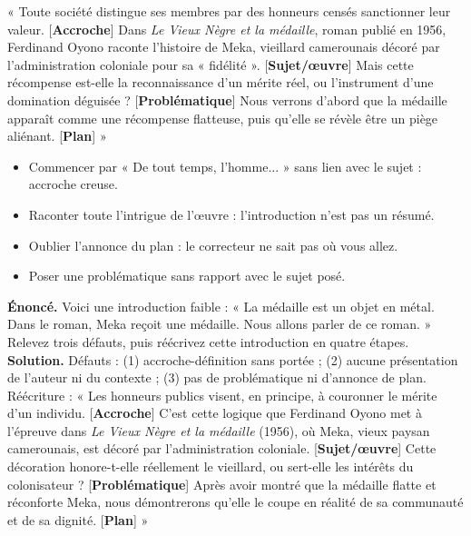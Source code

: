 \documentclass[11pt]{article}
\begin{document}
\begin{exemplebox}
« Toute société distingue ses membres par des honneurs censés sanctionner leur valeur. [\textbf{Accroche}] Dans \emph{Le Vieux Nègre et la médaille}, roman publié en 1956, Ferdinand Oyono raconte l'histoire de Meka, vieillard camerounais décoré par l'administration coloniale pour sa « fidélité ». [\textbf{Sujet/œuvre}] Mais cette récompense est-elle la reconnaissance d'un mérite réel, ou l'instrument d'une domination déguisée ? [\textbf{Problématique}] Nous verrons d'abord que la médaille apparaît comme une récompense flatteuse, puis qu'elle se révèle être un piège aliénant. [\textbf{Plan}] »
\end{exemplebox}

\begin{attention}
\begin{itemize}
\item Commencer par « De tout temps, l'homme... » sans lien avec le sujet : accroche creuse.
\item Raconter toute l'intrigue de l'œuvre : l'introduction n'est pas un résumé.
\item Oublier l'annonce du plan : le correcteur ne sait pas où vous allez.
\item Poser une problématique sans rapport avec le sujet posé.
\end{itemize}
\end{attention}

\begin{exoresolu}
\textbf{Énoncé.} Voici une introduction faible : « La médaille est un objet en métal. Dans le roman, Meka reçoit une médaille. Nous allons parler de ce roman. » Relevez trois défauts, puis réécrivez cette introduction en quatre étapes.
\tcblower
\textbf{Solution.} Défauts : (1) accroche-définition sans portée ; (2) aucune présentation de l'auteur ni du contexte ; (3) pas de problématique ni d'annonce de plan. Réécriture : « Les honneurs publics visent, en principe, à couronner le mérite d'un individu. [\textbf{Accroche}] C'est cette logique que Ferdinand Oyono met à l'épreuve dans \emph{Le Vieux Nègre et la médaille} (1956), où Meka, vieux paysan camerounais, est décoré par l'administration coloniale. [\textbf{Sujet/œuvre}] Cette décoration honore-t-elle réellement le vieillard, ou sert-elle les intérêts du colonisateur ? [\textbf{Problématique}] Après avoir montré que la médaille flatte et réconforte Meka, nous démontrerons qu'elle le coupe en réalité de sa communauté et de sa dignité. [\textbf{Plan}] »
\end{exoresolu}
\end{document}
